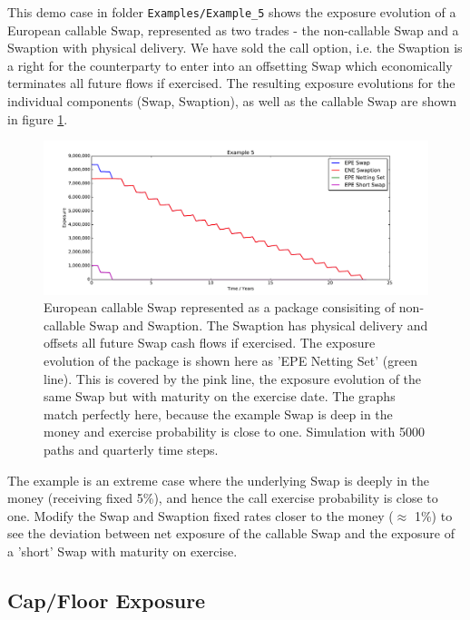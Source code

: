 \documentclass[12pt, a4paper]{article}
\begin{document}
{This demo case in folder {\tt Examples/Example\_5} shows the exposure evolution of a European callable Swap, represented
as two trades - the non-callable Swap and a Swaption with physical delivery. We have sold the call option, i.e. the
Swaption is a right for the counterparty to enter into an offsetting Swap which economically terminates all future flows
if exercised. The resulting exposure evolutions for the individual components (Swap, Swaption), as well as the callable
Swap are shown in figure \ref{fig_4}.
\begin{figure}[h!]
\begin{center}
\includegraphics[scale=0.45]{mpl_callable_swap.pdf}
\end{center}
\caption{European callable Swap represented as a package consisiting of non-callable Swap and Swaption. The Swaption has
  physical delivery and offsets all future Swap cash flows if exercised. The exposure evolution of the package is shown
  here as 'EPE Netting Set' (green line). This is covered by the pink line, the exposure evolution of the same Swap but
  with maturity on the exercise date. The graphs match perfectly here, because the example Swap is deep in the money and
  exercise probability is close to one. Simulation with 5000 paths and quarterly time steps.}
\label{fig_4}
\end{figure}
The example is an extreme case where the underlying Swap is deeply in the money (receiving fixed 5\%), and hence the
call exercise probability is close to one. Modify the Swap and Swaption fixed rates closer to the money ($\approx$ 1\%)
to see the deviation between net exposure of the callable Swap and the exposure of a 'short' Swap with maturity on
exercise.

\subsection{Cap/Floor Exposure}\label{sec:capfloor}

}
\end{document}
